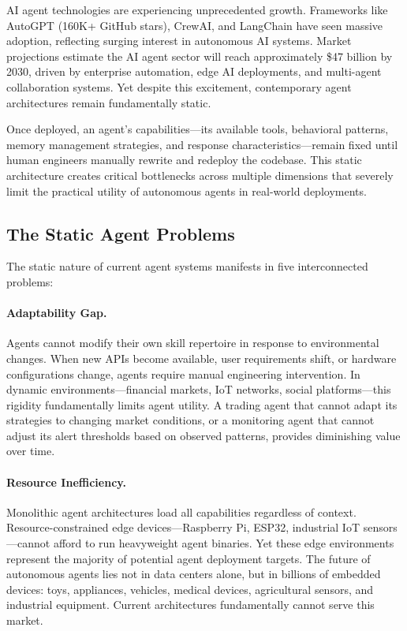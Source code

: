 \documentclass[conference]{IEEEtran}
\begin{document}
AI agent technologies are experiencing unprecedented growth. Frameworks like AutoGPT (160K+ GitHub stars), CrewAI, and LangChain have seen massive adoption, reflecting surging interest in autonomous AI systems. Market projections estimate the AI agent sector will reach approximately \$47 billion by 2030, driven by enterprise automation, edge AI deployments, and multi-agent collaboration systems. Yet despite this excitement, contemporary agent architectures remain fundamentally static.

Once deployed, an agent's capabilities—its available tools, behavioral patterns, memory management strategies, and response characteristics—remain fixed until human engineers manually rewrite and redeploy the codebase. This static architecture creates critical bottlenecks across multiple dimensions that severely limit the practical utility of autonomous agents in real-world deployments.

\subsection{The Static Agent Problems}

The static nature of current agent systems manifests in five interconnected problems:

\paragraph{Adaptability Gap.} Agents cannot modify their own skill repertoire in response to environmental changes. When new APIs become available, user requirements shift, or hardware configurations change, agents require manual engineering intervention. In dynamic environments—financial markets, IoT networks, social platforms—this rigidity fundamentally limits agent utility. A trading agent that cannot adapt its strategies to changing market conditions, or a monitoring agent that cannot adjust its alert thresholds based on observed patterns, provides diminishing value over time.

\paragraph{Resource Inefficiency.} Monolithic agent architectures load all capabilities regardless of context. Resource-constrained edge devices—Raspberry Pi, ESP32, industrial IoT sensors—cannot afford to run heavyweight agent binaries. Yet these edge environments represent the majority of potential agent deployment targets. The future of autonomous agents lies not in data centers alone, but in billions of embedded devices: toys, appliances, vehicles, medical devices, agricultural sensors, and industrial equipment. Current architectures fundamentally cannot serve this market.
\end{document}
